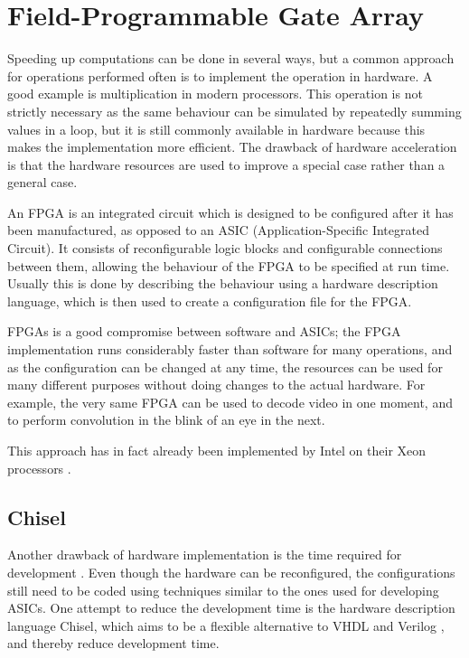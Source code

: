 \section{Field-Programmable Gate Array}
Speeding up computations can be done in several ways, but a common approach for operations performed often is to implement the operation in hardware.
A good example is multiplication in modern processors.
This operation is not strictly necessary as the same behaviour can be simulated by repeatedly summing values in a loop, but it is still commonly available in hardware because this makes the implementation more efficient.
The drawback of hardware acceleration is that the hardware resources are used to improve a special case rather than a general case.

An FPGA is an integrated circuit which is designed to be configured after it has been manufactured, as opposed to an ASIC (Application-Specific Integrated Circuit).
It consists of reconfigurable logic blocks and configurable connections between them, allowing the behaviour of the FPGA to be specified at run time. Usually this is done by describing the behaviour using a hardware description language, which is then used to create a configuration file for the FPGA.

FPGAs is a good compromise between software and ASICs; the FPGA implementation runs considerably faster than software for many operations, and as the configuration can be changed at any time, the resources can be used for many different purposes without doing changes to the actual hardware.
For example, the very same FPGA can be used to decode video in one moment, and to perform convolution in the blink of an eye in the next.

This approach has in fact already been implemented by Intel on their Xeon processors \cite{intelxeonfpga}.

\subsection{Chisel}
Another drawback of hardware implementation is the time required for development \cite{fpgaprosandcons}. 
Even though the hardware can be reconfigured, the configurations still need to be coded using techniques similar to the ones used for developing ASICs.
One attempt to reduce the development time is the hardware description language Chisel, which aims to be a flexible alternative to VHDL and Verilog \cite{chiselpaper}, and thereby reduce development time.

